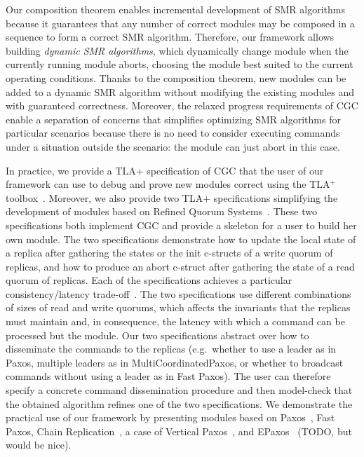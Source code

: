 Our composition theorem enables incremental development of SMR algorithms
because it guarantees that any number of correct modules may be composed in
a sequence to form a correct SMR algorithm. Therefore, our framework allows
building \emph{dynamic SMR algorithms}, which dynamically change module when
the currently running module aborts, choosing the module best suited to the
current operating conditions. Thanks to the composition theorem, new modules can
be added to a dynamic SMR algorithm without modifying the existing modules and
with guaranteed correctness. Moreover, the relaxed progress requirements of CGC
enable a separation of concerns that simplifies optimizing SMR algorithms for
particular scenarios because there is no need to consider executing commands
under a situation outside the scenario: the module can just abort in this case.

In practice, we provide a TLA+ specification of CGC that the user of our framework can use to debug and prove new modules correct using the TLA$^+$ toolbox~\cite{TLATools}.
Moreover, we also provide two TLA+ specifications simplifying the development of modules based on Refined Quorum Systems~\cite{GuerraouiVukolic10RefinedQuorumSystems}. These two specifications both implement CGC and provide a skeleton for a user to build her own module. The two specifications demonstrate how to update the local state of a replica after gathering the states or the init c-structs of a write quorum of replicas, and how to
produce an abort c-struct after gathering the state of a read quorum of replicas. Each of the specifications achieves a particular consistency/latency trade-off~\cite{Abadi12ConsistencyTradeoffsModernDistributedDatabaseSystem}.
The two specifications use different combinations of sizes of read and write quorums, which affects the invariants that the replicas must maintain and, in consequence, the latency with which a command can be processed but the module.
Our two specifications abstract over how to disseminate the commands to the replicas (e.g.\ whether to use a leader as in Paxos, multiple leaders as in MultiCoordinatedPaxos, or whether to broadcast commands without using a leader as in Fast Paxos).
The user can therefore specify a concrete command dissemination procedure and then model-check that the obtained algorithm refines one of the two specifications.  
We demonstrate the practical use of our framework by presenting modules based on Paxos~\cite{Lamport98ParttimeParliament}, Fast Paxos\cite{Lamport06FastPaxos}, Chain Replication~\cite{RenesseSchneider04ChainReplicationSupportingHighThroughputAvailability}, a case of Vertical Paxos~\cite{LamportMalkhiZhou09VerticalPaxosPrimarybackupReplication}, and EPaxos~\cite{MoraruAndersenKaminsky13ThereIsMoreConsensusEgalitarianParliaments}
(TODO, but would be nice).

